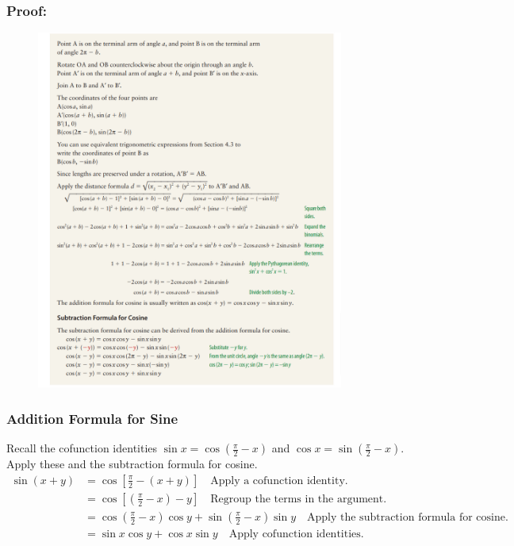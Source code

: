 \documentclass{article}
\begin{document}
\subsubsection{Proof: }
\begin{figure}[ht]
    \centering
    \includegraphics[width=0.9\textwidth]{imgs/proof.png}
\end{figure}

\subsubsection{Addition Formula for Sine}
Recall the cofunction identities $\sin x=\cos \left(\frac{\pi}{2}-x\right)$ and $\cos x=\sin \left(\frac{\pi}{2}-x\right)$.
Apply these and the subtraction formula for cosine.
$$
\begin{aligned}
\sin (x+y) & =\cos \left[\frac{\pi}{2}-(x+y)\right] \quad \text{Apply a cofunction identity.}\\
& =\cos \left[\left(\frac{\pi}{2}-x\right)-y\right] \quad \text{Regroup the terms in the argument.}\\
& =\cos \left(\frac{\pi}{2}-x\right) \cos y+\sin \left(\frac{\pi}{2}-x\right) \sin y \quad \text{Apply the subtraction formula for cosine.}\\
& =\sin x \cos y+\cos x \sin y \quad \text{Apply cofunction identities.}
\end{aligned}
$$
\end{document}
